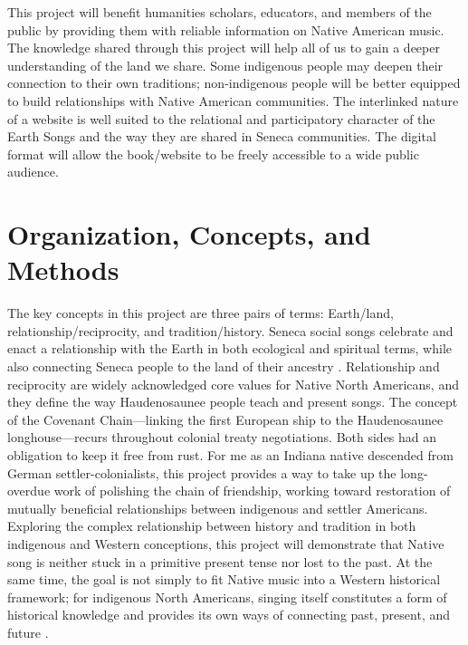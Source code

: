 \documentclass{neh}
\begin{document}
This project will benefit humanities scholars, educators, and members of the
public by providing them with reliable information on Native American
music.
The knowledge shared through this project will help all of us to gain a deeper
understanding of the land we share.
Some indigenous people may deepen their connection to their own traditions;
non-indigenous people will be better equipped to build relationships with
Native American communities.
The interlinked nature of a website is well suited to the relational and
participatory character of the Earth Songs and the way they are shared in
Seneca communities.
The digital format will allow the book/website to be freely 
accessible to a wide public audience.
\section{Organization, Concepts, and Methods}
The key concepts in this project are three pairs of terms: Earth/land,
relationship/reciprocity, and tradition/history.
Seneca social songs celebrate and enact a relationship with the Earth in both
ecological and spiritual terms, while also connecting Seneca people to the
land of their ancestry
\Autocites{Deloria:BrokenTreaties}{BasicCall}.
Relationship and reciprocity are widely acknowledged core values for Native
North Americans, and they define the way Haudenosaunee people teach and
present songs.
The concept of the Covenant Chain---linking the first European ship to the
Haudenosaunee longhouse---recurs throughout colonial treaty negotiations.
Both sides had an obligation to keep it free from rust.
For me as an Indiana native descended from German settler-colonialists, this
project provides a way to take up the long-overdue work of polishing the
chain of friendship, working toward restoration of mutually beneficial
relationships between indigenous and settler Americans. 
Exploring the complex relationship between history and tradition in both
indigenous and Western conceptions, this project will demonstrate that 
Native song is neither stuck in a primitive present tense nor lost to the past.
At the same time, the goal is not simply to fit Native music into a Western
historical framework; for indigenous North Americans, singing itself
constitutes a form of historical knowledge and provides its own ways of
connecting past, present, and future
\Autocite{Diamond:NativeAmericanHistory}.
\end{document}
